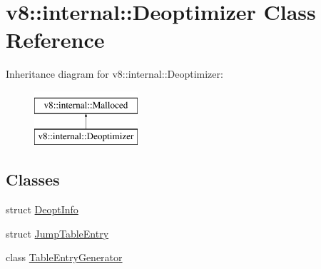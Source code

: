 \hypertarget{classv8_1_1internal_1_1Deoptimizer}{}\section{v8\+:\+:internal\+:\+:Deoptimizer Class Reference}
\label{classv8_1_1internal_1_1Deoptimizer}
Inheritance diagram for v8\+:\+:internal\+:\+:Deoptimizer\+:\begin{figure}[H]
\begin{center}
\leavevmode
\includegraphics[height=2.000000cm]{classv8_1_1internal_1_1Deoptimizer}
\end{center}
\end{figure}
\subsection*{Classes}
\begin{DoxyCompactItemize}
\item 
struct \mbox{\hyperlink{structv8_1_1internal_1_1Deoptimizer_1_1DeoptInfo}{Deopt\+Info}}
\item 
struct \mbox{\hyperlink{structv8_1_1internal_1_1Deoptimizer_1_1JumpTableEntry}{Jump\+Table\+Entry}}
\item 
class \mbox{\hyperlink{classv8_1_1internal_1_1Deoptimizer_1_1TableEntryGenerator}{Table\+Entry\+Generator}}
\end{DoxyCompactItemize}
